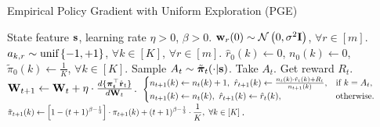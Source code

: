 \begin{algorithm}[t]
\caption{Empirical Policy Gradient with Uniform Exploration (PGE)}
\label{alg:policy_gradient_uniform_exploration}
\begin{algorithmic}
    State feature ${\mathbf{s}}$, learning rate $\eta > 0$, $\beta > 0$.
   \STATE ${\mathbf{w}}_r(0) \sim {\mathcal{N}}\left( 0, \sigma^2 {\mathbf{I}} \right)$, $\forall r \in [m]$. $a_{k, r} \sim 
   {\text{unif}}\left\{-1, +1\right\}$, $\forall k \in [K]$, $\forall r \in [m]$.
   \STATE $\hat{r}_{0}(k) \gets 0$, $n_{0}(k) \gets 0$, $\tilde{\pi}_0(k) \gets \frac{1}{K}$, $\forall k \in [K]$.
   \STATE Sample $A_{t} \sim \tilde{{\boldsymbol{\pi}}}_{t}(\cdot | {\mathbf{s}} )$. Take $A_{t}$. Get reward $R_{t}$.
   \STATE ${\mathbf{W}}_{t+1} \leftarrow {\mathbf{W}}_t + \eta \cdot \frac{d \{ {\boldsymbol{\pi}}_t^\top \hat{{\mathbf{r}}}_t \} }{d {\mathbf{W}}_t}$.
   \STATE $\scalemath{0.8}{ \left. 
		\begin{cases}
		n_{t+1}(k) \gets  n_{t}(k) + 1, \ \hat{r}_{t+1}(k) \gets \frac{n_{t}(k) \cdot \hat{r}_{t}(k) + R_{t} }{n_{t+1}(k)},  & \text{if } k = A_t, \\
		n_{t+1}(k) \gets n_{t}(k), \ \hat{r}_{t+1}(k) \gets \hat{r}_{t}(k),  & \text{otherwise}.
		\end{cases}
		\right.}$ 
   \STATE $\scalemath{0.75}{ \tilde{\pi}_{t+1}(k) \gets \left[ 1 - (t+1)^{ \beta - \frac{1}{3} } \right] \cdot  \pi_{t+1}(k) + (t+1)^{ \beta - \frac{1}{3} }  \cdot \frac{1}{K}, \ \forall k \in [K] }$.
   \ENDFOR
\end{algorithmic}
\end{algorithm}

